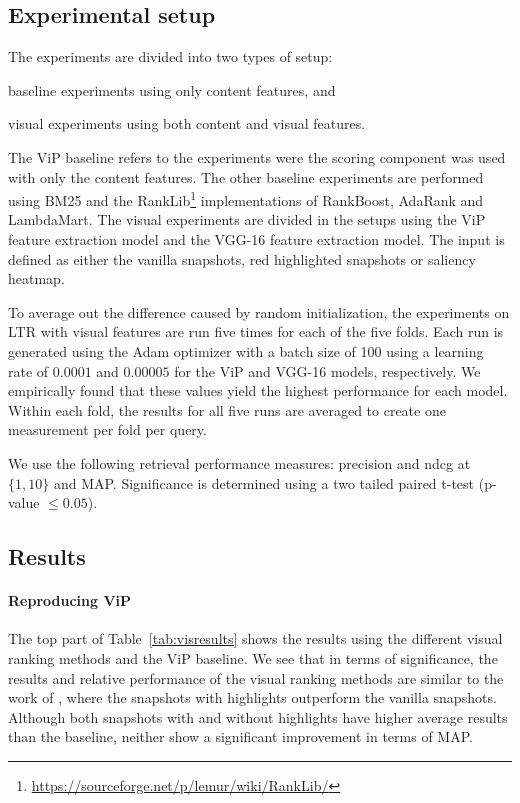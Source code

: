 \subsection{Experimental setup}
The experiments are divided into two types of setup:
\begin{inparaenum}[(i)]
\item baseline experiments using only content features, and
\item visual experiments using both content and visual features.
\end{inparaenum}

The ViP baseline refers to the experiments were the scoring component was used with only the content features. The other baseline experiments are performed using BM25 and the RankLib\footnote{\url{https://sourceforge.net/p/lemur/wiki/RankLib/}} implementations of RankBoost, AdaRank and LambdaMart.
The visual experiments are divided in the setups using the ViP feature extraction model and the VGG-16 feature extraction model. The input is defined as either the vanilla snapshots, red highlighted snapshots or saliency heatmap. 

To average out the difference caused by random initialization, the experiments on \ac{LTR} with visual features are run five times for each of the five folds. 
Each run is generated using the Adam optimizer with a batch size of 100 using a learning rate of $0.0001$ and $0.00005$ for the ViP and VGG-16 models, respectively. We empirically found that these values yield the highest performance for each model.
Within each fold, the results for all five runs are averaged to create one measurement per fold per query.

We use the following retrieval performance measures: precision and ndcg at $\{1,10\}$ and MAP.
Significance is determined using a two tailed paired t-test (p-value $\leq 0.05$). 

\subsection{Results}

\paragraph{Reproducing ViP}
The top part of Table~\ref{tab:visresults} shows the results using the different visual ranking methods and the ViP baseline. 
We see that in terms of significance, the results and relative performance of the visual ranking methods are similar to the work of \citet{fan2017learning}, where the snapshots with highlights outperform the vanilla snapshots. Although both snapshots with and without highlights have higher average results than the baseline, neither show a significant improvement in terms of MAP.

